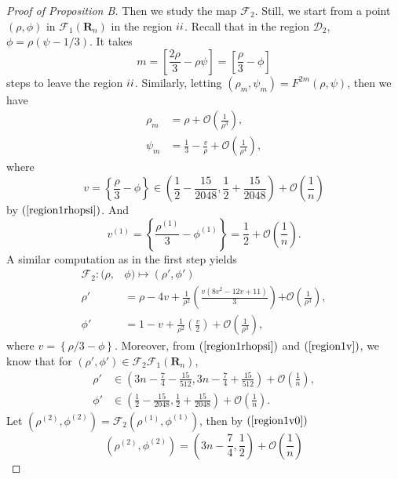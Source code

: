 \documentclass{article}
\def \Rtwo{\uppercase\expandafter{\romannumeral2}}
\numberwithin{figure}{section}
\numberwithin{equation}{section}
\theoremstyle{remark}
\theoremstyle{definition}
\begin{document}
\begin{proof}[Proof of Proposition B]
Then we study the map $\mathcal{F}_2$. Still, we start from a point $(\rho,\phi)$ in $\mathcal{F}_1(\mathbf{R}_n)$ in the region $\Rtwo$. Recall that in the region $\mathcal{D}_2$, $\phi=\rho(\psi-1/3)$. It takes
        $$m=\left[\frac{2\rho}{3}-\rho\psi\right]=\left[\frac{\rho}{3}-\phi\right]$$
        steps to leave the region $\Rtwo$. Similarly, letting $(\rho_m,\psi_m)=F^{2m}(\rho,\psi)$, then we have
    \begin{equation}\label{cross2}
		\begin{split}
			\rho_{m} &= \rho + \mathcal{O}\left( \frac{1}{\rho^{3}} \right),\\
			\psi_{m} &= \frac{1}{3} - \frac{v}{\rho} + \mathcal{O}\left( \frac{1}{\rho^{4}} \right),
		\end{split}
	\end{equation}
    where 
    \begin{equation}\label{region1v}
         v=\left\{\frac{\rho}{3}-\phi\right\}\in\left(\frac{1}{2}-\frac{15}{2048},\frac{1}{2}+\frac{15}{2048}\right)+\mathcal{O}\left(\frac{1}{n}\right)
    \end{equation}
    by $(\ref{region1rhopsi})$. And 
    \begin{equation}\label{region1v0}
         v^{(1)}=\left\{\frac{\rho^{(1)}}{3}-\phi^{(1)}\right\}=\frac{1}{2}+\mathcal{O}\left(\frac{1}{n}\right).
    \end{equation}
    A similar computation as in the first step yields
\begin{equation}\label{F2}
		\begin{split}
        \mathcal{F}_2:(\rho,&\phi)\mapsto(\rho',\phi')\\
			\rho' &= \rho -4v + \frac{1}{\rho^{2}}\left(\frac{v{\left(8v^2 -12v+11\right)}}{3}\right)\mathcal{+ O}\left( \frac{1}{\rho^{3}} \right),\\
			\phi'& =1- v + \frac{1}{\rho^{2}}\left(\frac{v}{2}\right)+
            \mathcal{O}\left( \frac{1}{\rho^{3}} \right),
		\end{split}
	\end{equation}
       where $v=\left\{\rho/3-\phi\right\}$. Moreover, from $(\ref{region1rhopsi})$ and $(\ref{region1v})$, we know that for $(\rho',\phi')\in\mathcal{F}_2\mathcal{F}_1(\mathbf{R}_n)$,
       \begin{equation}\label{region2rhopsi}
       \begin{split}
           \rho'&\in\left(3n-\frac{7}{4}-\frac{15}{512},3n-\frac{7}{4}+\frac{15}{512}\right)+\mathcal{O}\left(\frac{1}{n}\right),\\
           \phi'&\in\left(\frac{1}{2}-\frac{15}{2048},\frac{1}{2}+\frac{15}{2048}\right)+\mathcal{O}\left(\frac{1}{n}\right).
        \end{split}
       \end{equation}
        Let $(\rho^{(2)},\phi^{(2)})=\mathcal{F}_2(\rho^{(1)},\phi^{(1)})$, then by $(\ref{region1v0})$
       \begin{equation}\label{fixpoint 2}
           (\rho^{(2)},\phi^{(2)})=\left(3n-\frac{7}{4},\frac{1}{2}\right)+\mathcal{O}\left(\frac{1}{n}\right)
       \end{equation}
       

\end{proof}
\end{document}
